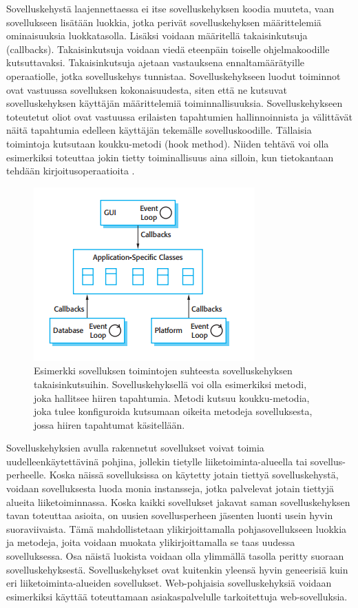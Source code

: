 \documentclass[utf8]{gradu3}
\begin{document}
Sovelluskehystä laajennettaessa ei itse sovelluskehyksen koodia muuteta, vaan sovellukseen lisätään luokkia, jotka perivät sovelluskehyksen määrittelemiä ominaisuuksia luokkatasolla. Lisäksi voidaan määritellä takaisinkutsuja (callbacks). Takaisinkutsuja voidaan viedä eteenpäin toiselle ohjelmakoodille kutsuttavaksi. Takaisinkutsuja ajetaan vastauksena ennaltamäärätyille operaatiolle, jotka sovelluskehys tunnistaa. Sovelluskehykseen luodut toiminnot ovat vastuussa sovelluksen kokonaisuudesta, siten että ne kutsuvat sovelluskehyksen käyttäjän määrittelemiä toiminnallisuuksia. Sovelluskehykseen toteutetut oliot ovat vastuussa erilaisten tapahtumien hallinnoinnista ja välittävät näitä tapahtumia edelleen käyttäjän tekemälle sovelluskoodille.  Tällaisia toimintoja kutsutaan koukku-metodi (hook method). Niiden tehtävä voi olla esimerkiksi toteuttaa jokin tietty toiminallisuus aina silloin, kun tietokantaan tehdään kirjoitusoperaatioita \parencite[s. 433]{Sommerville}. 

\begin{figure}[h]
\centering
\includegraphics[scale=0.85]{frameworks.png}
\caption{Esimerkki sovelluksen toimintojen suhteesta sovelluskehyksen takaisinkutsuihin. Sovelluskehyksellä voi olla esimerkiksi metodi, joka hallitsee hiiren tapahtumia. Metodi kutsuu koukku-metodia, joka tulee konfiguroida kutsumaan oikeita metodeja sovelluksesta, jossa hiiren tapahtumat käsitellään.   \parencite[s.434]{Sommerville}}
\end{figure}

Sovelluskehyksien avulla rakennetut sovellukset voivat toimia uudelleenkäytettävinä pohjina, jollekin tietylle liiketoiminta-alueella tai sovellus-perheelle. Koska näissä sovelluksissa on käytetty jotain tiettyä sovelluskehystä, voidaan sovelluksesta luoda monia instansseja, jotka palvelevat jotain tiettyjä alueita liiketoiminnassa. Koska kaikki sovellukset jakavat saman sovelluskehyksen tavan toteuttaa asioita, on uusien sovellusperheen jäsenten luonti usein hyvin suoraviivaista. Tämä mahdollistetaan ylikirjoittamalla pohjasovellukseen luokkia ja metodeja, joita voidaan muokata ylikirjoittamalla se taas uudessa sovelluksessa. Osa näistä luokista voidaan olla ylimmällä tasolla peritty suoraan sovelluskehyksestä. Sovelluskehykset ovat kuitenkin yleensä hyvin geneerisiä kuin eri
liiketoiminta-alueiden sovellukset. Web-pohjaisia sovelluskehyksiä voidaan esimerkiksi käyttää toteuttamaan asiakaspalvelulle tarkoitettuja web-sovelluksia. 
\end{document}
